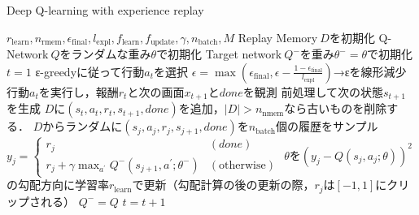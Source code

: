 \documentclass{jarticle}
\begin{document}
\begin{algorithm}[tb]
\caption{Deep Q-learning with experience replay}
\label{alg:dqn}                          
\begin{algorithmic}[1]   
\REQUIRE $r_{\mathrm{learn}},n_{\mathrm{rmem}},\epsilon_{\mathrm{final}},l_{\mathrm{expl}},f_{\mathrm{learn}},f_{\mathrm{update}},\gamma,n_{\mathrm{batch}}, M$
\STATE Replay Memory$~D$を初期化
\STATE Q-Network$~Q$をランダムな重み$\theta$で初期化
\STATE Target network$~Q^-$を重み$\theta^-=\theta$で初期化
\STATE $t=1$
\STATE ε-greedyに従って行動$a_t$を選択
\STATE $\epsilon=\max{(\epsilon_{\mathrm{final}},\epsilon-\frac{1-\epsilon_{\mathrm{final}}}{l_{\mathrm{expl}}})}$→εを線形減少
\STATE 行動$a_t$を実行し，報酬$r_t$と次の画面$x_{t+1}$と$done$を観測
\STATE 前処理して次の状態$s_{t+1}$を生成
\STATE $D$に$(s_t,a_t,r_t,s_{t+1},done)$を追加，$|D|>n_{\mathrm{nmem}}$なら古いものを削除する．
\STATE $D$からランダムに$(s_j,a_j,r_j,s_{j+1},done)$を$n_{\mathrm{batch}}$個の履歴をサンプル
\STATE $y_j=
\begin{cases}
r_j & (done) \\
r_j+\gamma\max_{a^{\prime}}Q^-(s_{j+1},a^{\prime};\theta^-) & (\mbox{otherwise})
\end{cases}$
\STATE $\theta$を$(y_j-Q(s_j,a_j;\theta))^2$の勾配方向に学習率$r_{\mathrm{learn}}$で更新（勾配計算の後の更新の際，$r_j$は$[-1,1]$にクリップされる）
\ENDIF
{}
\STATE $Q^-=Q$
\ENDIF
\ENDIF
\STATE $t=t+1$
\ENDWHILE
\ENDFOR
\end{algorithmic}
\end{algorithm}
\end{document}
